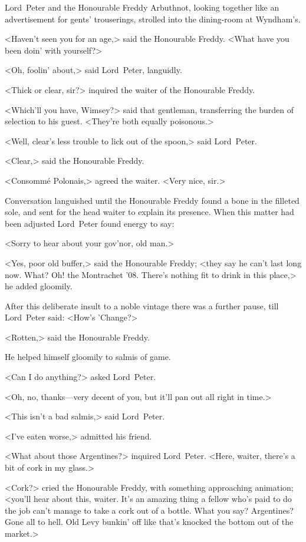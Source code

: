 Lord~Peter and the Honourable Freddy Arbuthnot, looking together like an advertisement for gents' trouserings, strolled into the dining-room at Wyndham's.

<Haven't seen you for an age,> said the Honourable Freddy. <What have you been doin' with yourself?>

<Oh, foolin' about,> said Lord~Peter, languidly.

<Thick or clear, sir?> inquired the waiter of the Honourable Freddy.

<Which'll you have, Wimsey?> said that gentleman, transferring the burden of selection to his guest. <They're both equally poisonous.>

<Well, clear's less trouble to lick out of the spoon,> said Lord~Peter.

<Clear,> said the Honourable Freddy.

<Consommé Polonais,> agreed the waiter. <Very nice, sir.>

Conversation languished until the Honourable Freddy found a bone in the filleted sole, and sent for the head waiter to explain its presence. When this matter had been adjusted Lord~Peter found energy to say:

<Sorry to hear about your gov'nor, old man.>

<Yes, poor old buffer,> said the Honourable Freddy; <they say he can't last long now. What? Oh! the Montrachet '08. There's nothing fit to drink in this place,> he added gloomily.

After this deliberate insult to a noble vintage there was a further pause, till Lord~Peter said: <How's 'Change?>

<Rotten,> said the Honourable Freddy.

He helped himself gloomily to salmis of game.

<Can I do anything?> asked Lord~Peter.

<Oh, no, thanks—very decent of you, but it'll pan out all right in time.>

<This isn't a bad salmis,> said Lord~Peter.

<I've eaten worse,> admitted his friend.

<What about those Argentines?> inquired Lord~Peter. <Here, waiter, there's a bit of cork in my glass.>

<Cork?> cried the Honourable Freddy, with something approaching animation; <you'll hear about this, waiter. It's an amazing thing a fellow who's paid to do the job can't manage to take a cork out of a bottle. What you say? Argentines? Gone all to hell. Old Levy bunkin' off like that's knocked the bottom out of the market.>

